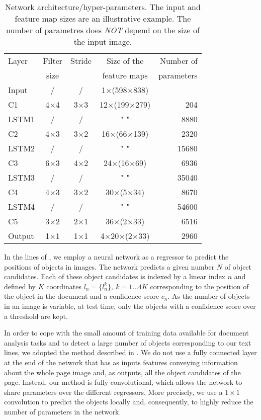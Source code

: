 \documentclass[conference]{IEEEtran}
\def\NA{} %
\begin{document}
\begin{table}
\begin{center}
\caption{Network architecture/hyper-parameters. The input and feature map sizes are an illustrative example. The number of parametres does \emph{NOT} depend on the size of the input image.}
\label{tab:architecture}
\begin{tabular}{lcccr}
Layer & Filter  & Stride & Size of the  & Number of  \\ %
      & size    &        & feature maps & parameters \\
\arrayrulecolor{cwblue1} \toprule  
Input & / & / & 1$\times$(598$\times$838) & \NA \\
C1  & 4$\times$4 & 3$\times$3 & 12$\times$(199$\times$279) & 204 \\
LSTM1 & / & / & " " & 8880 \\
C2 & 4$\times$3 & 3$\times$2 & 16$\times$(66$\times$139) & 2320 \\
LSTM2 & / & / & " " & 15680 \\
C3 & 6$\times$3 & 4$\times$2 & 24$\times$(16$\times$69) & 6936 \\
LSTM3 & / & / & " " & 35040 \\
C4 & 4$\times$3 & 3$\times$2 & 30$\times$(5$\times$34) & 8670 \\
LSTM4 & / & / & " " & 54600 \\
C5 & 3$\times$2 & 2$\times$1 & 36$\times$(2$\times$33) & 6516 \\
Output & 1$\times$1 & 1$\times$1 & 4$\times$20$\times$(2$\times$33) & 2960 \\
\end{tabular}
\end{center}
\end{table}

In the lines of \cite{erhan2014scalable}, we employ a neural network as a regressor to predict the positions of objects in images. The network predicts a given number $N$ of object candidates. Each of these object candidates is indexed by a linear index $n$ and defined by $K$ coordinates $l_n{=}\{ l^{k}_n \}, \ k{=}{1\dots4K}$ corresponding to the position of the object in the document and a confidence score $c_n$. As the number of objects in an image is variable, at test time, only the objects with a confidence score over a threshold are kept.

In order to cope with the small amount of training data available for   document analysis tasks and to detect a large number of objects corresponding to our text lines, we adopted the method described in \cite{moysset2016learning}. We do not use a fully connected layer at the end of the network that has as inputs features conveying information about the whole page image and, as outputs, all the object candidates of the page. Instead, our method is fully convolutional, which allows the network to share parameters over the different regressors. More precisely, we use a $1{\times}1$ convolution to predict the objects locally and, consequently, to highly reduce the number of parameters in the network. 
\end{document}
